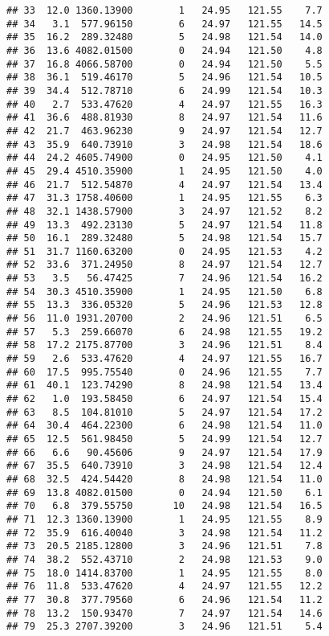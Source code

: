 \documentclass[
]{article}
\begin{document}
\begin{verbatim}
## 33  12.0 1360.13900        1   24.95   121.55    7.7
## 34   3.1  577.96150        6   24.97   121.55   14.5
## 35  16.2  289.32480        5   24.98   121.54   14.0
## 36  13.6 4082.01500        0   24.94   121.50    4.8
## 37  16.8 4066.58700        0   24.94   121.50    5.5
## 38  36.1  519.46170        5   24.96   121.54   10.5
## 39  34.4  512.78710        6   24.99   121.54   10.3
## 40   2.7  533.47620        4   24.97   121.55   16.3
## 41  36.6  488.81930        8   24.97   121.54   11.6
## 42  21.7  463.96230        9   24.97   121.54   12.7
## 43  35.9  640.73910        3   24.98   121.54   18.6
## 44  24.2 4605.74900        0   24.95   121.50    4.1
## 45  29.4 4510.35900        1   24.95   121.50    4.0
## 46  21.7  512.54870        4   24.97   121.54   13.4
## 47  31.3 1758.40600        1   24.95   121.55    6.3
## 48  32.1 1438.57900        3   24.97   121.52    8.2
## 49  13.3  492.23130        5   24.97   121.54   11.8
## 50  16.1  289.32480        5   24.98   121.54   15.7
## 51  31.7 1160.63200        0   24.95   121.53    4.2
## 52  33.6  371.24950        8   24.97   121.54   12.7
## 53   3.5   56.47425        7   24.96   121.54   16.2
## 54  30.3 4510.35900        1   24.95   121.50    6.8
## 55  13.3  336.05320        5   24.96   121.53   12.8
## 56  11.0 1931.20700        2   24.96   121.51    6.5
## 57   5.3  259.66070        6   24.98   121.55   19.2
## 58  17.2 2175.87700        3   24.96   121.51    8.4
## 59   2.6  533.47620        4   24.97   121.55   16.7
## 60  17.5  995.75540        0   24.96   121.55    7.7
## 61  40.1  123.74290        8   24.98   121.54   13.4
## 62   1.0  193.58450        6   24.97   121.54   15.4
## 63   8.5  104.81010        5   24.97   121.54   17.2
## 64  30.4  464.22300        6   24.98   121.54   11.0
## 65  12.5  561.98450        5   24.99   121.54   12.7
## 66   6.6   90.45606        9   24.97   121.54   17.9
## 67  35.5  640.73910        3   24.98   121.54   12.4
## 68  32.5  424.54420        8   24.98   121.54   11.0
## 69  13.8 4082.01500        0   24.94   121.50    6.1
## 70   6.8  379.55750       10   24.98   121.54   16.5
## 71  12.3 1360.13900        1   24.95   121.55    8.9
## 72  35.9  616.40040        3   24.98   121.54   11.2
## 73  20.5 2185.12800        3   24.96   121.51    7.8
## 74  38.2  552.43710        2   24.98   121.53    9.0
## 75  18.0 1414.83700        1   24.95   121.55    8.0
## 76  11.8  533.47620        4   24.97   121.55   12.2
## 77  30.8  377.79560        6   24.96   121.54   11.2
## 78  13.2  150.93470        7   24.97   121.54   14.6
## 79  25.3 2707.39200        3   24.96   121.51    5.4

\end{verbatim}
\end{document}
